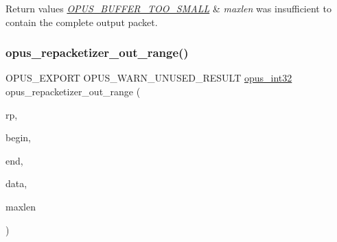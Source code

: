 \begin{DoxyRetVals}{Return values}
{\em \mbox{\hyperlink{group__opus__errorcodes_gacd897c05563ec04a67d8e92ba29f3d4f}{O\+P\+U\+S\+\_\+\+B\+U\+F\+F\+E\+R\+\_\+\+T\+O\+O\+\_\+\+S\+M\+A\+LL}}} & {\itshape maxlen} was insufficient to contain the complete output packet. \\
\hline
\end{DoxyRetVals}
\mbox{\label{group__opus__repacketizer_gad06762a8f4032823f6b64b63e8416efc}} 
\subsubsection{\texorpdfstring{opus\_repacketizer\_out\_range()}{opus\_repacketizer\_out\_range()}}
{\footnotesize\ttfamily O\+P\+U\+S\+\_\+\+E\+X\+P\+O\+RT O\+P\+U\+S\+\_\+\+W\+A\+R\+N\+\_\+\+U\+N\+U\+S\+E\+D\+\_\+\+R\+E\+S\+U\+LT \mbox{\hyperlink{opus__types_8h_aa4d309d6f80b99dbabebc8f98879ab9a}{opus\+\_\+int32}} opus\+\_\+repacketizer\+\_\+out\+\_\+range (\begin{DoxyParamCaption}\item[{\mbox{\hyperlink{group__opus__repacketizer_ga1f85070a64bcbf5bf24f5ccb80323e7b}{Opus\+Repacketizer}} $\ast$}]{rp,  }\item[{int}]{begin,  }\item[{int}]{end,  }\item[{unsigned char $\ast$}]{data,  }\item[{\mbox{\hyperlink{opus__types_8h_aa4d309d6f80b99dbabebc8f98879ab9a}{opus\+\_\+int32}}}]{maxlen }\end{DoxyParamCaption})}

